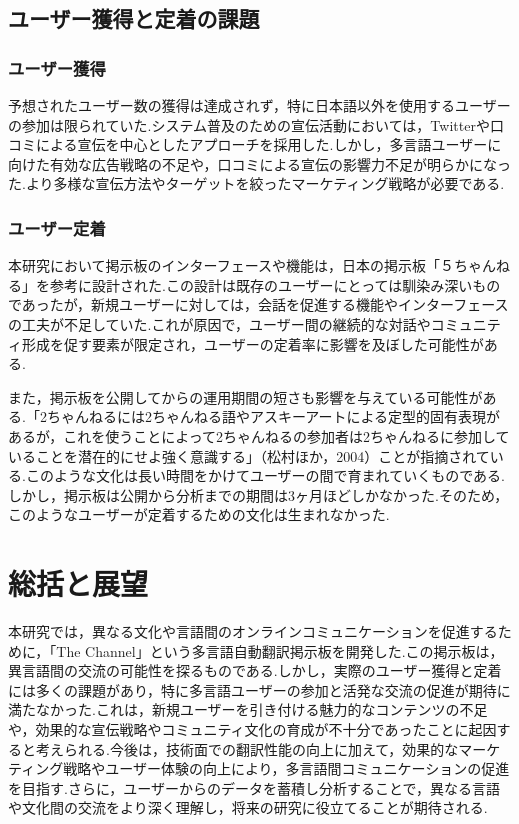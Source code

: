 \documentclass[b5paper,12pt,dvipdfmx]{jsreport}
\begin{document}
\subsection{ユーザー獲得と定着の課題}

\subsubsection{ユーザー獲得}
予想されたユーザー数の獲得は達成されず，特に日本語以外を使用するユーザーの参加は限られていた.システム普及のための宣伝活動においては，Twitterや口コミによる宣伝を中心としたアプローチを採用した.しかし，多言語ユーザーに向けた有効な広告戦略の不足や，口コミによる宣伝の影響力不足が明らかになった.より多様な宣伝方法やターゲットを絞ったマーケティング戦略が必要である.

\subsubsection{ユーザー定着}
本研究において掲示板のインターフェースや機能は，日本の掲示板「５ちゃんねる」を参考に設計された.この設計は既存のユーザーにとっては馴染み深いものであったが，新規ユーザーに対しては，会話を促進する機能やインターフェースの工夫が不足していた.これが原因で，ユーザー間の継続的な対話やコミュニティ形成を促す要素が限定され，ユーザーの定着率に影響を及ぼした可能性がある.

また，掲示板を公開してからの運用期間の短さも影響を与えている可能性がある.「2ちゃんねるには2ちゃんねる語やアスキーアートによる定型的固有表現があるが，これを使うことによって2ちゃんねるの参加者は2ちゃんねるに参加していることを潜在的にせよ強く意識する」（松村ほか，2004）ことが指摘されている.このような文化は長い時間をかけてユーザーの間で育まれていくものである.しかし，掲示板は公開から分析までの期間は3ヶ月ほどしかなかった.そのため，このようなユーザーが定着するための文化は生まれなかった.

\section{総括と展望}

本研究では，異なる文化や言語間のオンラインコミュニケーションを促進するために，「The Channel」という多言語自動翻訳掲示板を開発した.この掲示板は，異言語間の交流の可能性を探るものである.しかし，実際のユーザー獲得と定着には多くの課題があり，特に多言語ユーザーの参加と活発な交流の促進が期待に満たなかった.これは，新規ユーザーを引き付ける魅力的なコンテンツの不足や，効果的な宣伝戦略やコミュニティ文化の育成が不十分であったことに起因すると考えられる.今後は，技術面での翻訳性能の向上に加えて，効果的なマーケティング戦略やユーザー体験の向上により，多言語間コミュニケーションの促進を目指す.さらに，ユーザーからのデータを蓄積し分析することで，異なる言語や文化間の交流をより深く理解し，将来の研究に役立てることが期待される.
\end{document}
